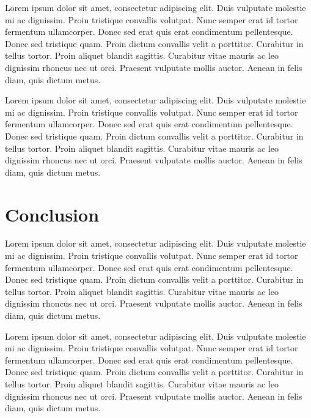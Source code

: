 \documentclass[11pt]{article}
\begin{document}
Lorem ipsum dolor sit amet, consectetur adipiscing elit. Duis vulputate molestie mi ac dignissim. Proin tristique convallis volutpat. Nunc semper erat id tortor fermentum ullamcorper. Donec sed erat quis erat condimentum pellentesque. Donec sed tristique quam. Proin dictum convallis velit a porttitor. Curabitur in tellus tortor. Proin aliquet blandit sagittis. Curabitur vitae mauris ac leo dignissim rhoncus nec ut orci. Praesent vulputate mollis auctor. Aenean in felis diam, quis dictum metus.

Lorem ipsum dolor sit amet, consectetur adipiscing elit. Duis vulputate molestie mi ac dignissim. Proin tristique convallis volutpat. Nunc semper erat id tortor fermentum ullamcorper. Donec sed erat quis erat condimentum pellentesque. Donec sed tristique quam. Proin dictum convallis velit a porttitor. Curabitur in tellus tortor. Proin aliquet blandit sagittis. Curabitur vitae mauris ac leo dignissim rhoncus nec ut orci. Praesent vulputate mollis auctor. Aenean in felis diam, quis dictum metus.

\section{Conclusion}
Lorem ipsum dolor sit amet, consectetur adipiscing elit. Duis vulputate molestie mi ac dignissim. Proin tristique convallis volutpat. Nunc semper erat id tortor fermentum ullamcorper. Donec sed erat quis erat condimentum pellentesque. Donec sed tristique quam. Proin dictum convallis velit a porttitor. Curabitur in tellus tortor. Proin aliquet blandit sagittis. Curabitur vitae mauris ac leo dignissim rhoncus nec ut orci. Praesent vulputate mollis auctor. Aenean in felis diam, quis dictum metus.

Lorem ipsum dolor sit amet, consectetur adipiscing elit. Duis vulputate molestie mi ac dignissim. Proin tristique convallis volutpat. Nunc semper erat id tortor fermentum ullamcorper. Donec sed erat quis erat condimentum pellentesque. Donec sed tristique quam. Proin dictum convallis velit a porttitor. Curabitur in tellus tortor. Proin aliquet blandit sagittis. Curabitur vitae mauris ac leo dignissim rhoncus nec ut orci. Praesent vulputate mollis auctor. Aenean in felis diam, quis dictum metus.
\end{document}
